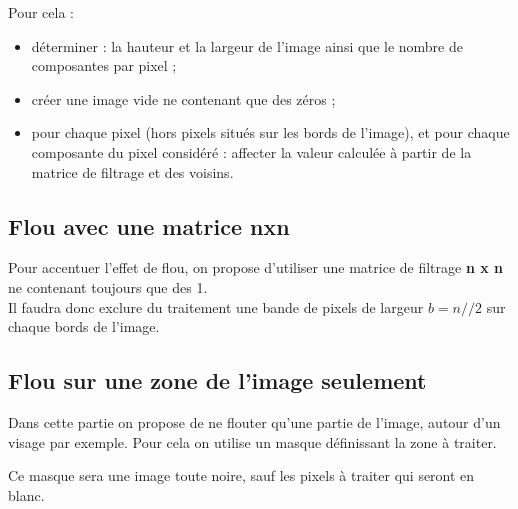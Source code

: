 
Pour cela :
\begin{itemize}
\item déterminer : la hauteur et  la largeur de l'image ainsi que le nombre de composantes par pixel ;
\item créer une image vide ne contenant que des zéros ;
\item pour chaque pixel (hors pixels situés sur les bords de l'image), et pour chaque composante du pixel considéré :  affecter la valeur calculée à partir de la matrice de filtrage et des voisins.
\end{itemize}


\subsection{Flou avec une matrice nxn}
Pour accentuer l'effet de flou, on propose d'utiliser une matrice de filtrage \textbf{n x n} ne contenant toujours que des 1.\\
Il faudra donc exclure du traitement une bande de pixels de largeur $b=n//2$ sur chaque bords de l'image.




\subsection{Flou sur une zone de l'image seulement}
Dans cette partie on propose de ne flouter qu'une partie de l'image, autour d'un visage par exemple. Pour cela on utilise un masque définissant la zone à traiter.

Ce masque sera une image toute noire, sauf les pixels à traiter qui seront en blanc.


